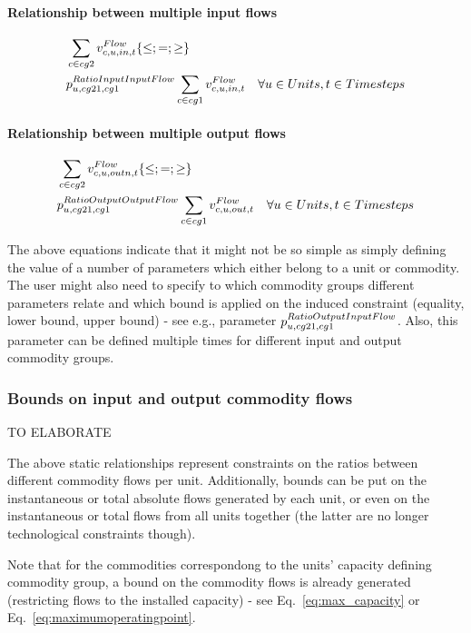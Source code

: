\documentclass[10pt,english]{article}
\begin{document}
\paragraph{Relationship between multiple input flows}
\begin{align} \label{eq:ratioinputinputflow}
&\sum_{\commodity \in cg2} \vFlow[\commodity,\unit,in,\timestep] \{\le;=;\ge\} \nonumber \\
&\pRatioInputInputFlow \sum_{\commodity \in cg1} \vFlow[\commodity,\unit,in,\timestep] \quad \forall \units, \timesteps
\end{align}

\paragraph{Relationship between multiple output flows}
\begin{align} \label{eq:ratiooutputoutputflow}
&\sum_{\commodity \in cg2} \vFlow[\commodity,\unit,outn,\timestep] \{\le;=;\ge\} \nonumber \\
&\pRatioOutputOutputFlow \sum_{\commodity \in cg1} \vFlow[\commodity,\unit,out,\timestep] \quad \forall \units, \timesteps
\end{align}

{\color{red}
The above equations indicate that it might not be so simple as simply defining the value of a number of parameters which either belong to a unit or commodity. The user might also need to specify to which commodity groups different parameters relate and which bound is applied on the induced constraint (equality, lower bound, upper bound) - see e.g., parameter $\pRatioOutputInputFlow$. Also, this parameter can be defined multiple times for different input and output commodity groups. 
}

\subsubsection{Bounds on input and output commodity flows}
{\color{red} TO ELABORATE}

The above static relationships represent constraints on the ratios between different commodity flows per unit. Additionally, bounds can be put on the instantaneous or total absolute flows generated by each unit, or even on the instantaneous or total flows from all units together (the latter are no longer technological constraints though).

Note that for the commodities correspondong to the units' capacity defining commodity group, a bound on the commodity flows is already generated (restricting flows to the installed capacity) - see Eq.~\eqref{eq:max_capacity} or Eq.~\eqref{eq:maximumoperatingpoint}.
\end{document}
